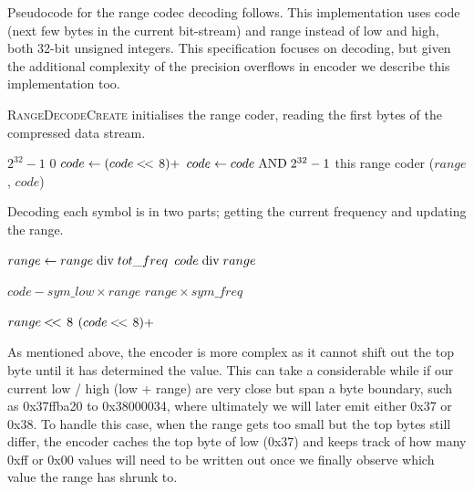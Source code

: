 \documentclass[a4paper]{article}
\begin{document}
Pseudocode for the range codec decoding follows.
This implementation uses code (next few bytes in the current bit-stream) and range instead of low and high, both 32-bit unsigned integers.
This specification focuses on decoding, but given the additional complexity of the precision overflows in encoder we describe this implementation too.

\textsc{RangeDecodeCreate} initialises the range coder, reading the first bytes of the compressed data stream.

\begin{algorithmic}[1]
  \settowidth{\maxwidth}{range\ }
  \State {} $2^{32}-1$
  \State {} $0$
    \State $code \gets (code \mathbin{<\mkern-3mu<\,} 8) + $
  \EndFor
  \State $code \gets code \bitand 2^{32}-1$
  \State \Return this range coder ($range$, $code$)
\EndFunction
\end{algorithmic}

Decoding each symbol is in two parts; getting the current frequency and updating the range.

\begin{algorithmic}[1]
  \State $range \gets range \bdiv tot\_freq$
  \State \Return $code \bdiv range$
\EndFunction
\end{algorithmic}

\begin{algorithmic}[1]
  \settowidth{\maxwidth}{range\ }
  \State {} $code - sym\_low \times range$
  \State {} $range \times sym\_freq$

   
    \settowidth{\maxwidth}{range\ }
    \State {} $range \mathbin{<\mkern-3mu<\,} 8$
    \State {} $(code\mathbin{<\mkern-3mu<\,}8) + $
  \EndWhile
\EndProcedure
\end{algorithmic}

As mentioned above, the encoder is more complex as it cannot shift out the top byte until it has determined the value.
This can take a considerable while if our current low / high (low + range) are very close but span a byte boundary, such as 0x37ffba20 to 0x38000034, where ultimately we will later emit either 0x37 or 0x38.
To handle this case, when the range gets too small but the top bytes still differ, the encoder caches the top byte of low (0x37) and keeps track of how many 0xff or 0x00 values will need to be written out once we finally observe which value the range has shrunk to.
\end{document}

